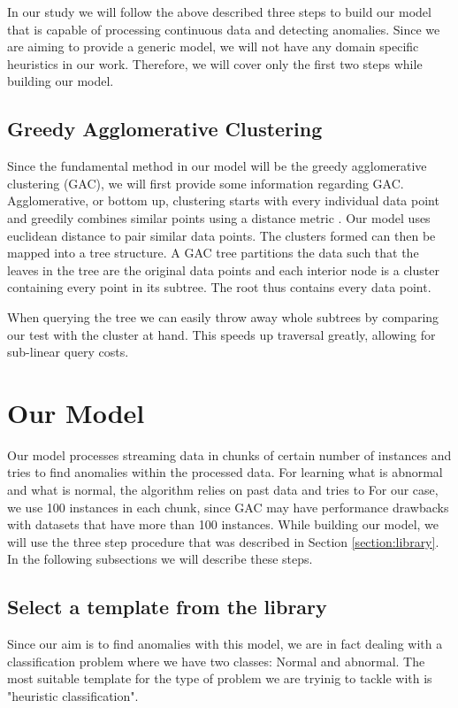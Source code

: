 \documentclass[conference]{IEEEtran}
\begin{document}
In our study we will follow the above described three steps to build our model that is capable of processing continuous data and detecting anomalies.
Since we are aiming to provide a generic model, we will not have any domain specific heuristics in our work.
Therefore, we will cover only the first two steps while building our model.

\subsection{Greedy Agglomerative Clustering}
Since the fundamental method in our model will be the greedy
agglomerative clustering (GAC), we will first provide some information
regarding GAC.  Agglomerative, or bottom up, clustering starts with
every individual data point and greedily combines similar points using
a distance metric \cite{Walter}. Our model uses euclidean distance to
pair similar data points. The clusters formed can then be mapped into
a tree structure. A GAC tree partitions the data such that the leaves
in the tree are the original data points and each interior node is a
cluster containing every point in its subtree. The root thus contains
every data point.

When querying the tree we can easily throw away whole subtrees by
comparing our test with the cluster at hand. This speeds up traversal
greatly, allowing for sub-linear query costs.

\section{Our Model}

Our model processes streaming data in chunks of certain number of
instances and tries to find anomalies within the processed data.  For
learning what is abnormal and what is normal, the algorithm relies on
past data and tries to For our case, we use 100 instances in each
chunk, since GAC may have performance drawbacks with datasets that
have more than 100 instances.  While building our model, we will use
the three step procedure that was described in Section
\ref{section:library}.  In the following subsections we will describe
these steps.

\subsection{Select a template from the library}
Since our aim is to find anomalies with this model, we are in fact
dealing with a classification problem where we have two classes:
Normal and abnormal.  The most suitable template for the type of
problem we are tryinig to tackle with is "heuristic classification".
\end{document}
